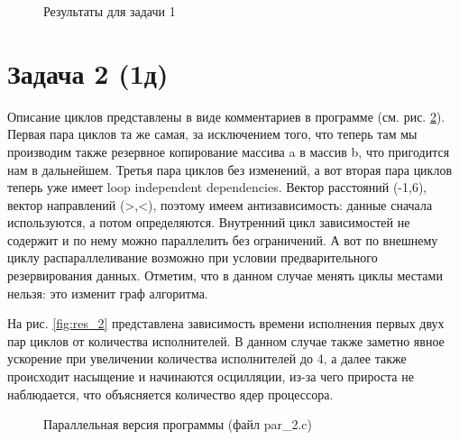 \documentclass[a4paper,12pt]{article} %
\begin{document}
\begin{figure}[h!]
	\caption{Результаты для задачи 1}
	\label{fig:res_1}
\end{figure}

\section{Задача 2 (1д)}

Описание циклов представлены в виде комментариев в программе (см. рис. \ref{fig:program_2}).
Первая пара циклов та же самая, за исключением того, что теперь там мы производим также резервное копирование массива a в массив b, что пригодится нам в дальнейшем.
Третья пара циклов без изменений, а вот вторая пара циклов
теперь уже имеет loop independent dependencies. Вектор расстояний (-1,6), вектор направлений (>,<), поэтому имеем антизависимость: данные сначала используются, а потом определяются.
Внутренний цикл зависимостей не содержит и по нему можно параллелить без ограничений. А вот по внешнему циклу распараллеливание возможно при условии предварительного резервирования данных.
Отметим, что в данном случае менять циклы местами нельзя: это изменит граф алгоритма.

На рис. \ref{fig:res_2} представлена зависимость времени исполнения первых двух пар циклов от количества исполнителей.
В данном случае также заметно явное ускорение при увеличении количества исполнителей до 4, а далее также
происходит насыщение и начинаются осцилляции, из-за чего прироста не наблюдается, что объясняется количество ядер процессора.

\begin{figure}[h!]
	\caption{Параллельная версия программы (файл par\_2.c)}
	\label{fig:program_2}
\end{figure}
\end{document}
